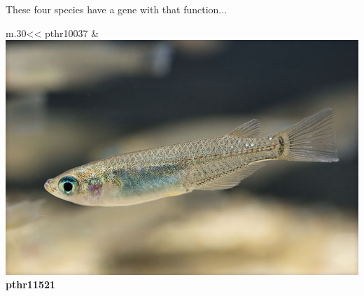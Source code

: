 \documentclass[aspectratio=169, 9pt, handout]{beamer}\usepackage[]{graphicx}\usepackage[]{color}
\begin{document}
\begin{frame}[t]

These four species have a gene with that function... 

\vfill

\def\tmpwidth{.30\linewidth}
\begin{table}
\footnotesize
\begin{tabular}{*{2}{m{\tmpwidth}<\centering}}
   \linebreak pthr10037 & %
\includegraphics[width=1\linewidth]{Oryzias_latipes.jpg} \linebreak \textbf{pthr11521} \\ %

\end{tabular}
\end{table}
\end{frame}
\end{document}

